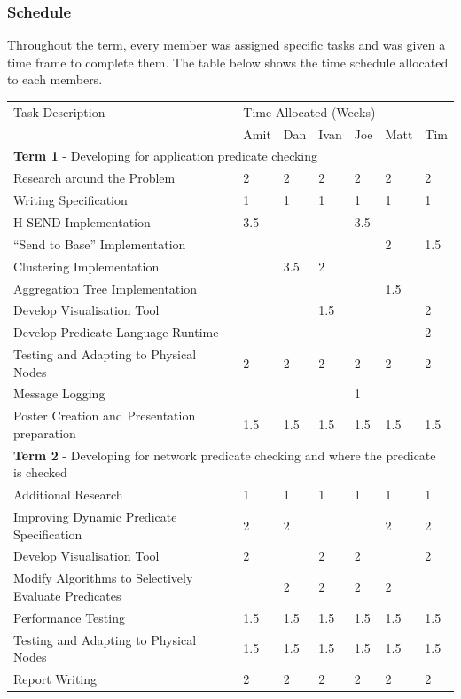 \subsubsection{Schedule}

Throughout the term, every member was assigned specific tasks and was given a time frame to complete them. The table below shows the time schedule allocated to each members.

\begin{table}[H]
	\centering
	\begin{tabular}{| l | l | l | l | l | l | l |}
	\hline
	Task Description & \multicolumn{6}{l|}{Time Allocated (Weeks)}\\
	~ & Amit & Dan & Ivan & Joe & Matt & Tim \\
	\hline
	\hline
	\multicolumn{7}{|l|}{\textbf{Term 1} - Developing for application predicate checking} \\
	\hline


	Research around the Problem & 2 & 2 & 2 & 2 & 2 & 2\\
	Writing Specification & 1 & 1 & 1 & 1 & 1 & 1\\
	H-SEND Implementation & 3.5 & ~ & ~ & 3.5 & ~ & ~\\
	``Send to Base'' Implementation & ~ & ~ & ~ & ~ & 2 & 1.5\\
	Clustering Implementation & ~ & 3.5 & 2 & ~ & ~ & ~\\
	Aggregation Tree Implementation & ~ & ~ & ~ & ~ & 1.5 & ~\\
	Develop Visualisation Tool & ~ & ~ & 1.5 & ~ & ~ & 2\\
	Develop Predicate Language Runtime & ~ & ~ & ~ & ~ & ~ & 2\\
	Testing and Adapting to Physical Nodes & 2 & 2 & 2 & 2 & 2 & 2\\
	Message Logging & ~ & ~ & ~ & 1 & ~ & ~\\
	Poster Creation and Presentation preparation & 1.5 & 1.5 & 1.5 & 1.5 & 1.5 & 1.5\\

	\hline
	\hline
	\multicolumn{7}{|l|}{\textbf{Term 2} - Developing for network predicate checking and where the predicate is checked} \\
	\hline
	
	Additional Research & 1 & 1 & 1 & 1 & 1 & 1\\
	Improving Dynamic Predicate Specification & 2 & 2 & ~ & ~ & 2 & 2\\
	Develop Visualisation Tool & 2 & ~ & 2 & 2 & ~ & 2\\
	Modify Algorithms to Selectively Evaluate Predicates & ~ & 2 & 2 & 2 & 2 & ~\\
	Performance Testing & 1.5 & 1.5 & 1.5 & 1.5 & 1.5 & 1.5\\
	Testing and Adapting to Physical Nodes & 1.5 & 1.5 & 1.5 & 1.5 & 1.5 & 1.5\\
	Report Writing & 2 & 2 & 2 & 2 & 2 & 2\\
	\hline
	
	\end{tabular}
\end{table}

